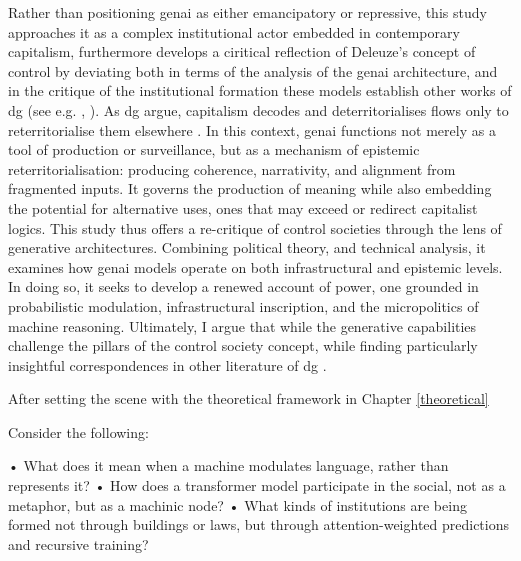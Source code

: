 Rather than positioning \gls{genai} as either emancipatory or repressive, this study approaches it as a complex institutional actor embedded in contemporary capitalism, furthermore develops a ciritical reflection of Deleuze's concept of control by deviating both in terms of the analysis of the \gls{genai} architecture, and in the critique of the institutional formation these models establish other works of \gls{dg}  (see e.g. \cite{deleuze1983}, \cite{deleuze1987}). As \gls{dg} argue, capitalism decodes and deterritorialises flows only to reterritorialise them elsewhere \parencite{deleuze1983}. In this context, \gls{genai} functions not merely as a tool of production or surveillance, but as a mechanism of epistemic reterritorialisation: producing coherence, narrativity, and alignment from fragmented inputs. It governs the production of meaning while also embedding the potential for alternative uses, ones that may exceed or redirect capitalist logics. This study thus offers a re-critique of control societies through the lens of generative architectures. Combining political theory, and technical analysis, it examines how \gls{genai} models operate on both infrastructural and epistemic levels. In doing so, it seeks to develop a renewed account of power, one grounded in probabilistic modulation, infrastructural inscription, and the micropolitics of machine reasoning. Ultimately, I argue that while the generative capabilities challenge the pillars of the control society concept, while finding particularly insightful correspondences in other literature of \gls{dg} .


After setting the scene with the theoretical framework in Chapter \ref{theoretical} 

\begin{orangebox}
	Consider the following:


	•	What does it mean when a machine modulates language, rather than represents it?
	•	How does a transformer model participate in the social, not as a metaphor, but as a machinic node?
	•	What kinds of institutions are being formed not through buildings or laws, but through attention-weighted predictions and recursive training?
\end{orangebox}


